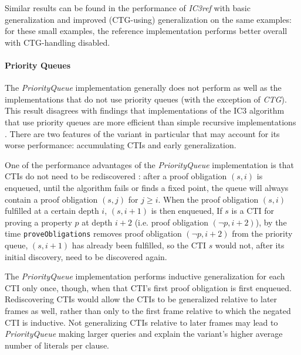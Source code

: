 \documentclass[12pt,a4paper,twoside,openright]{report}
\begin{document}
{{Similar results can be found
in the performance of \emph{IC3ref} with basic generalization and
improved (CTG-using) generalization on the same examples: for these small examples,
the reference implementation performs better overall with CTG-handling disabled.}

\paragraph{Priority Queues}{
The \emph{PriorityQueue} implementation generally does not perform as well as the
implementations that do not use priority queues (with the exception of \emph{CTG}).
This result disagrees with findings that implementations of the IC3 algorithm that
use priority queues are more efficient than simple recursive implementations
\cite{een11,griggio14}.
There are
two features of the variant in particular that may account for its worse performance: accumulating
CTIs and early generalization.

One of the performance advantages of the \emph{PriorityQueue} implementation is that CTIs do not need
to be rediscovered \cite{een11}: after a proof obligation $(s,i)$ is enqueued, until the algorithm fails or finds a fixed point,
the queue will always contain a proof obligation $(s,j)$ for $j \geq i$. When the proof obligation $(s,i)$
fulfilled at a certain depth $i$, $(s,i + 1)$ is then enqueued, If $s$ is a CTI for proving a property
$p$ at depth $i + 2$ (i.e. proof obligation $(\neg p, i + 2)$), by the time \verb,proveObligations, removes
proof obligation $(\neg p, i + 2)$ from the priority queue, $(s, i+1)$ has already been fulfilled, so the
CTI $s$ would not, after its initial discovery, need to be discovered again.


The \emph{PriorityQueue} implementation performs inductive generalization for each CTI only once, though,
when that CTI's first proof obligation is first enqueued. Rediscovering CTIs would allow the CTIs to
be generalized relative to later frames as well, rather than only to the first frame relative to which
the negated CTI is inductive. Not generalizing CTIs relative to later frames may lead to
\emph{PriorityQueue} making larger queries and explain the variant's higher average number of
literals per clause.
}

}
\end{document}
